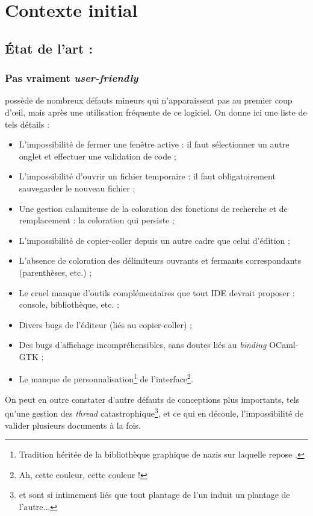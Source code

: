 \section{Contexte initial}

\subsection{État de l'art : \CoqIde{}}

\subsubsection{Pas vraiment \emph{user-friendly}}

\CoqIde{} possède de nombreux défauts mineurs qui n'apparaissent pas au premier coup d'\oe{}il, mais après une utilisation fréquente de ce logiciel. On donne ici une liste de tels détails :

\begin{itemize}
  \item L'impossibilité de fermer une fenêtre active : il faut sélectionner un autre onglet et effectuer une validation de code ;
  \item L'impossibilité d'ouvrir un fichier temporaire : il faut obligatoirement sauvegarder le nouveau fichier ;
  \item Une gestion calamiteuse de la coloration des fonctions de recherche et de remplacement : la coloration qui persiste ;
  \item L'impossibilité de copier-coller depuis un autre cadre que celui d'édition ;
  \item L'absence de coloration des délimiteurs ouvrants et fermants correspondants (parenthèses, etc.) ;
  \item Le cruel manque d'outils complémentaires que tout IDE devrait proposer : console, bibliothèque, etc. ;
  \item Divers bugs de l'éditeur (liés au copier-coller) ;
  \item Des bugs d'affichage incompréhensibles, sans doutes liés au \emph{binding} OCaml-GTK ;
  \item Le manque de personnalisation\footnote{Tradition héritée de la bibliothèque graphique de nazis sur laquelle repose \CoqIde{}.} de l'interface\footnote{Ah, cette couleur, cette couleur !}.
\end{itemize}

On peut en outre constater d'autre défauts de conceptions plus importants, tels qu'une gestion des \emph{thread} catastrophique\footnote{\coqtop{} et \CoqIde{} sont si intimement liés que tout plantage de l'un induit un plantage de l'autre...}, et ce qui en découle, l'impossibilité de valider plusieurs documents à la fois.

